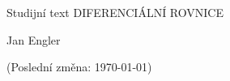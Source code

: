 \thispagestyle{empty}
\begin{center}
    \phantom{}
    \vfill
    {\sffamily\Huge Studijní text DIFERENCIÁLNÍ ROVNICE \par}
    \vspace{10em}
    {\Huge Jan Engler}
    \vfill

    \vspace{2em}

    {\small\ttfamily (Poslední změna: \today)}
\end{center}
